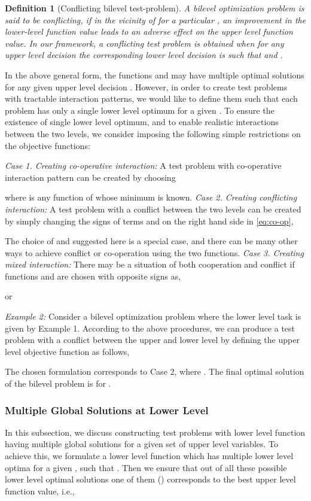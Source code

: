 \documentclass[twoside]{article}
\newtheorem{definition}[theorem]{Definition}
\begin{document}
\vskip 0.2cm
\begin{definition}[Conflicting bilevel test-problem]
A bilevel optimization problem is said to be conflicting, if in the vicinity of  for a particular , an improvement in the lower-level function value leads to an adverse effect on the upper level function value. In our framework, a conflicting test problem is obtained when for any upper level decision  the corresponding lower level decision  is such that  and .
\end{definition}
\vskip 0.2cm

In the above general form, the functions  and  may have multiple optimal solutions for any given upper level decision . However, in order to create test problems with tractable interaction patterns, we would like to define them such that each problem has only a single lower level optimum for a given . To ensure the existence of single lower level optimum, and to enable realistic interactions between the two levels, we consider imposing the following simple restrictions on the objective functions:

\vskip 0.2cm
\textit{Case 1. Creating co-operative interaction: }
A test problem with co-operative interaction pattern can be created by choosing 

where  is any function of  whose minimum is known. 
\vskip 0.2cm
\textit{Case 2. Creating conflicting interaction: } 
A test problem with a conflict between the two levels can be created by simply changing the signs of terms  and   on the right hand side in \eqref{eq:co-op},

The choice of  and  suggested here is a special case, and there can be many other ways to achieve conflict or co-operation using the two functions.
\vskip 0.2cm
\textit{Case 3. Creating mixed interaction: } 
There may be a situation of both cooperation and conflict if functions  and  are chosen with opposite signs as,

or 

\vskip 0.2cm


\textit{Example 2:} 
Consider a bilevel optimization problem where the lower level task is given by Example 1. According to the above procedures, we can produce a test problem with a conflict between the upper and lower level by defining the upper level objective function as follows,

The chosen formulation corresponds to Case 2, where . The final optimal solution of the bilevel problem is  for .

\subsubsection{Multiple Global Solutions at Lower Level}
In this subsection, we discuss constructing test problems with lower level function having multiple global solutions for a given set of upper level variables. To achieve this, we formulate a lower level function which has multiple lower level optima for a given , such that . Then we ensure that out of all these possible lower level optimal solutions one of them () corresponds to the best upper level function value, i.e.,
\end{document}
